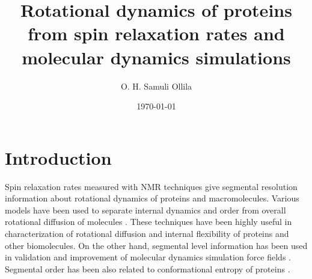 \documentclass[pre,aps,floatfix,authordate1-4,twocolumn]{revtex4-1}
\begin{document}

\title{Rotational dynamics of proteins from spin relaxation rates and molecular dynamics simulations} %



\author{O. H. Samuli Ollila}


\date{\today}

\begin{abstract}
  
\end{abstract}


\maketitle %



\section{Introduction}
Spin relaxation rates measured with NMR techniques give segmental resolution
information about rotational dynamics of proteins and macromolecules.
Various models have been used to separate internal dynamics and order from
overall rotational diffusion of molecules \cite{??}.
These techniques have been highly useful in characterization of 
rotational diffusion and internal flexibility of proteins and other biomolecules.
On the other hand, segmental level information has been used in validation
and improvement of molecular dynamics simulation force fields \cite{??}.
Segmental order has been also related to conformational entropy of proteins \cite{??}.
\end{document}
